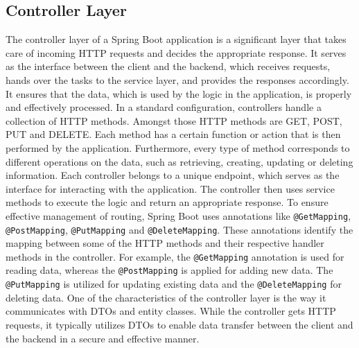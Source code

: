     \subsection{Controller Layer}
    The controller layer of a Spring Boot application is a significant layer that takes care of incoming HTTP requests and decides the appropriate response. It serves as the interface between the client and the backend, which receives requests, hands over the tasks to the service layer, and provides the responses accordingly. It ensures that the data, which is used by the logic in the application, is properly and effectively processed. \newline
    In a standard configuration, controllers handle a collection of HTTP methods. Amongst those HTTP methods are GET, POST, PUT and DELETE. Each method has a certain function or action that is then performed by the application. Furthermore, every type of method corresponds to different operations on the data, such as retrieving, creating, updating or deleting information. Each controller belongs to a unique endpoint, which serves as the interface for interacting with the application. The controller then uses service methods to execute the logic and return an appropriate response. \newline
    To ensure effective management of routing, Spring Boot uses annotations like \texttt{@GetMapping}, \texttt{@PostMapping}, \texttt{@PutMapping} and \texttt{@DeleteMapping}. These annotations identify the mapping between some of the HTTP methods and their respective handler methods in the controller. For example, the \texttt{@GetMapping} annotation is used for reading data, whereas the \texttt{@PostMapping} is applied for adding new data. The \texttt{@PutMapping} is utilized for updating existing data and the \texttt{@DeleteMapping} for deleting data. \newline
    One of the characteristics of the controller layer is the way it communicates with DTOs and entity classes. While the controller gets HTTP requests, it typically utilizes DTOs to enable data transfer between the client and the backend in a secure and effective manner.

